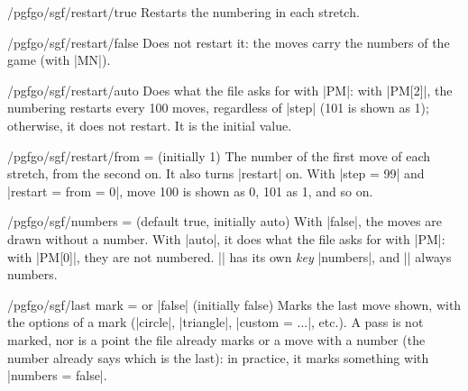 \begin{key}{/pgfgo/sgf/restart/true}
	Restarts the numbering in each stretch.
\end{key}

\begin{key}{/pgfgo/sgf/restart/false}
	Does not restart it: the moves carry the numbers of the game (with |MN|).
\end{key}

\begin{key}{/pgfgo/sgf/restart/auto}
	Does what the file asks for with |PM|: with |PM[2]|, the numbering restarts every 100 moves, regardless of |step| (101 is shown as 1); otherwise, it does not restart. It is the initial value.
\end{key}

\begin{key}{/pgfgo/sgf/restart/from =  (initially 1)}
	The number of the first move of each stretch, from the second on. It also turns |restart| on. With |step = 99| and |restart = {from = 0}|, move 100 is shown as 0, 101 as 1, and so on.

	\begin{codeexample}[]
		\begin{goban}[sgf size = variations]
		\end{goban}
	\end{codeexample}
\end{key}

\begin{key}{/pgfgo/sgf/numbers =  (default true, initially auto)}
	With |false|, the moves are drawn without a number. With |auto|, it does what the file asks for with |PM|: with |PM[0]|, they are not numbered. |\sgfdiagrams| has its own \emph{key} |numbers|, and |\sgfproblem| always numbers.

	\begin{codeexample}[]
		\begin{goban}[sgf size = variations]
		\end{goban}
	\end{codeexample}
\end{key}

\begin{key}{/pgfgo/sgf/last mark =  or |false| (initially false)}
	Marks the last move shown, with the options of a mark (|circle|, |triangle|, |custom = ...|, etc.). A pass is not marked, nor is a point the file already marks or a move with a number (the number already says which is the last): in practice, it marks something with |numbers = false|.

	\begin{codeexample}[]
		\begin{goban}[sgf size = variations]
		\end{goban}
	\end{codeexample}
\end{key}

